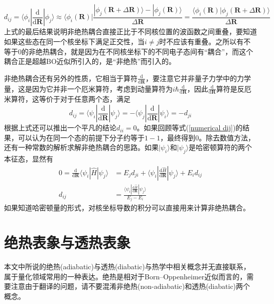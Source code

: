 \documentclass[12pt,a4paper,openany,twoside]{book}
\numberwithin{equation}{section}
\begin{document}
        \begin{equation}
          d_{ij}=\langle\phi_i|\frac{\mathrm{d}}{\mathrm{d}\mathbf{R}}|\phi_j\rangle\approx\langle\phi_i(\mathbf{R})|\frac{|\phi_j(\mathbf{R}+\Delta\mathbf{R})\rangle-|\phi_j(\mathbf{R})\rangle}{\Delta\mathbf{R}}
          =\frac{\langle\phi_i(\mathbf{R})|\phi_j(\mathbf{R}+\Delta\mathbf{R})\rangle}{\Delta\mathbf{R}}
          \label{numerical dij}
        \end{equation}
        上式的最后结果说明非绝热耦合直接正比于不同核位置的波函数之间重叠，要知道如果这些态在同一个核坐标下满足正交性，当$i\neq j$时不应该有重叠。之所以有不等于0的非绝热耦合，就是因为在不同核坐标下的不同电子态间有“耦合”，而这个耦合正是超越BO近似所引入的，是“非绝热”而引入的。

        非绝热耦合还有另外的性质，它相当于算符$\frac{\mathrm{d}}{\mathrm{d}\mathbf{R}}$，要注意它并非量子力学中的力学量，这是因为它并非一个厄米算符，考虑到动量算符为$i\hbar\frac{\mathrm{d}}{\mathrm{d}\mathbf{R}}$，因此$\frac{\mathrm{d}}{\mathrm{d}\mathbf{R}}$算符是反厄米算符，这等价于对于任意两个态，满足
        \begin{equation}
          d_{ij}=\langle\psi_i|\frac{\mathrm{d}}{\mathrm{d}\mathbf{R}}|\psi_j\rangle=-\langle\psi_j|\frac{\mathrm{d}}{\mathrm{d}\mathbf{R}}|\psi_i\rangle=-d_{ji}
          \label{dij=-dji}
        \end{equation}
        根据上式还可以推出一个平凡的结论$d_{ii}=0$。如果回顾等式(\ref{numerical dij})的结果，可以认为在同一个态的前提下分子约等于$1-1$，最终得到$0$。除去数值方法，还有一种常数的解析求解非绝热耦合的思路。如果$|\psi_i\rangle$和$|\psi_j\rangle$是哈密顿算符的两个本征态，显然有
        \begin{equation}
          \begin{aligned}
            0=\frac{\mathrm{d}}{\mathrm{d}\mathbf{R}}\langle\psi_i|\hat{H}|\psi_j\rangle&=E_j d_{ji}+\langle\psi_i|\frac{\mathrm{d}\hat{H}}{\mathrm{d}\mathbf{R}}|\psi_j\rangle+E_i d_{ij}\\
            d_{ij}&=\frac{\langle\psi_i|\frac{\mathrm{d}\hat{H}}{\mathrm{d}\mathbf{R}}|\psi_j\rangle}{E_j-E_i}
          \end{aligned} 
          \label{analytical dij}
        \end{equation}
        如果知道哈密顿量的形式，对核坐标导数的积分可以直接用来计算非绝热耦合。
      \section{绝热表象与透热表象}
        本文中所说的绝热(adiabatic)与透热(diabatic)与热学中相关概念并无直接联系，属于量化领域常用的一种表达。绝热是相对于Born–Oppenheimer近似而言的，需要注意由于翻译的问题，请不要混淆非绝热(non-adiabatic)和透热(diabatic)两个概念。
\end{document}
